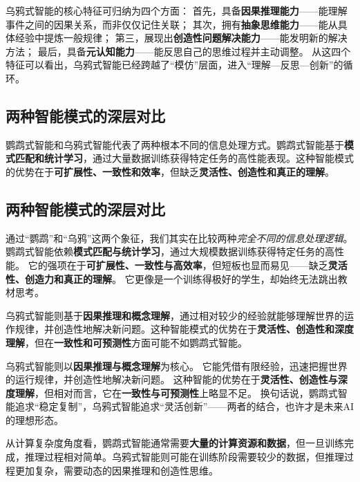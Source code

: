 乌鸦式智能的核心特征可归纳为四个方面：
首先，具备\textbf{因果推理能力}——能理解事件之间的因果关系，而非仅仅记住关联；
其次，拥有\textbf{抽象思维能力}——能从具体经验中提炼一般规律；
第三，展现出\textbf{创造性问题解决能力}——能发明新的解决方法；
最后，具备\textbf{元认知能力}——能反思自己的思维过程并主动调整。
从这四个特征可以看出，乌鸦式智能已经跨越了“模仿”层面，进入“理解—反思—创新”的循环。

\subsection{两种智能模式的深层对比}

鹦鹉式智能和乌鸦式智能代表了两种根本不同的信息处理方式。鹦鹉式智能基于\textbf{模式匹配和统计学习}，通过大量数据训练获得特定任务的高性能表现。这种智能模式的优势在于\textbf{可扩展性、一致性和效率}，但缺乏\textbf{灵活性、创造性和真正的理解}。

\subsection{两种智能模式的深层对比}

通过“鹦鹉”和“乌鸦”这两个象征，我们其实在比较两种\emph{完全不同的信息处理逻辑}。
鹦鹉式智能依赖\textbf{模式匹配与统计学习}，通过大规模数据训练获得特定任务的高性能。
它的强项在于\textbf{可扩展性、一致性与高效率}，但短板也显而易见——缺乏\textbf{灵活性、创造力和真正的理解}。
它更像是一个训练得极好的学生，却始终无法跳出教材思考。

乌鸦式智能则基于\textbf{因果推理和概念理解}，通过相对较少的经验就能够理解世界的运作规律，并创造性地解决新问题。这种智能模式的优势在于\textbf{灵活性、创造性和深度理解}，但在\textbf{一致性和可预测性}方面可能不如鹦鹉式智能。

乌鸦式智能则以\textbf{因果推理与概念理解}为核心。
它能凭借有限经验，迅速把握世界的运行规律，并创造性地解决新问题。
这种智能的优势在于\textbf{灵活性、创造性与深度理解}，但相对而言，它在\textbf{一致性与可预测性}上略显不足。
换句话说，鹦鹉式智能追求“稳定复制”，乌鸦式智能追求“灵活创新”——两者的结合，也许才是未来AI的理想形态。

从计算复杂度角度看，鹦鹉式智能通常需要\textbf{大量的计算资源和数据}，但一旦训练完成，推理过程相对简单。乌鸦式智能则可能在训练阶段需要较少的数据，但推理过程更加复杂，需要动态的因果推理和创造性思维。

